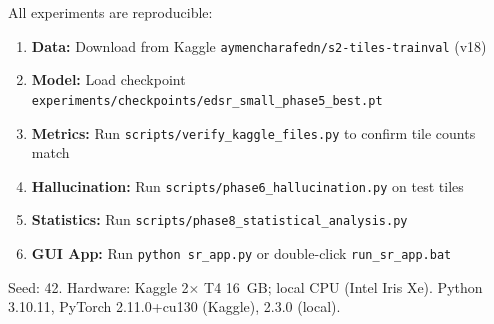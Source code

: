 \documentclass[12pt,a4paper]{report}
\begin{document}
All experiments are reproducible:
\begin{enumerate}
    \item \textbf{Data:} Download from Kaggle \texttt{aymencharafedn/s2-tiles-trainval} (v18)
    \item \textbf{Model:} Load checkpoint \texttt{experiments/checkpoints/edsr\_small\_phase5\_best.pt}
    \item \textbf{Metrics:} Run \texttt{scripts/verify\_kaggle\_files.py} to confirm tile counts match
    \item \textbf{Hallucination:} Run \texttt{scripts/phase6\_hallucination.py} on test tiles
    \item \textbf{Statistics:} Run \texttt{scripts/phase8\_statistical\_analysis.py}
    \item \textbf{GUI App:} Run \texttt{python sr\_app.py} or double-click \texttt{run\_sr\_app.bat}
\end{enumerate}

Seed: 42. Hardware: Kaggle 2$\times$ T4 16~GB; local CPU (Intel Iris Xe). Python 3.10.11, PyTorch 2.11.0+cu130 (Kaggle), 2.3.0 (local).
\end{document}
